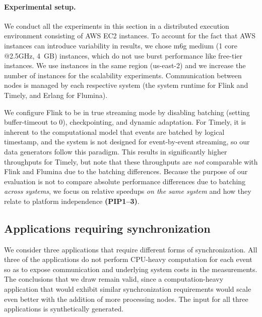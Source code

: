 \paragraph{Experimental setup.}
We conduct all the experiments in this section in a distributed execution environment
consisting of AWS EC2 instances.
To account for the fact that AWS instances can introduce variability in results, we chose m6g medium (1 core @2.5GHz,
4~GB) instances, which do not use burst performance like free-tier instances.
We use instances in the same region (us-east-2) and we increase the number of instances for the scalability experiments.
Communication between nodes is managed by each respective system (the system runtime for Flink and Timely, and Erlang for Flumina).

We configure Flink to be in true streaming mode by disabling batching (setting buffer-timeout to $0$), checkpointing, and dynamic adaptation.
For Timely, it is inherent to the computational model that events are batched by logical timestamp, and the system is not designed for event-by-event streaming, so our data generators follow this paradigm.
This results in significantly higher throughputs for Timely, but note that these throughputs are \emph{not} comparable with Flink and Flumina due to the batching differences.
Because the purpose of our evaluation is not to compare absolute performance differences due to batching \emph{across systems},
we focus on relative speedups \emph{on the same system} and how they relate to platform independence \textbf{(PIP1--3)}.

\subsection{Applications requiring synchronization}
\label{dgs:ssec:eval-applications}

We consider three applications that require different forms of synchronization. All three of the applications do not perform CPU-heavy computation for each event so as to expose communication and underlying system costs in the measurements. The conclusions that we draw remain valid, since a computation-heavy application that would exhibit similar synchronization requirements would scale even better with the addition of more processing nodes.
The input for all three applications is synthetically generated.

